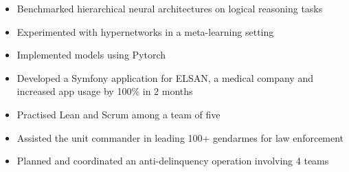 \documentclass[10pt,a4paper]{altacv}
\begin{document}
\divider




\begin{itemize}
\item Benchmarked hierarchical neural architectures on logical reasoning tasks
\item Experimented with hypernetworks in a meta-learning setting
\item Implemented models using Pytorch 
\end{itemize}
\divider

\begin{itemize}
\item Developed a Symfony application for ELSAN, a medical company and increased app usage by 100\% in 2 months
\item Practised Lean and Scrum among a team of five
\end{itemize}
\divider


\begin{itemize}
\item  Assisted the unit commander in leading 100+ gendarmes for law enforcement
\item Planned and coordinated an anti-delinquency operation involving 4 teams
\end{itemize}
\end{document}
